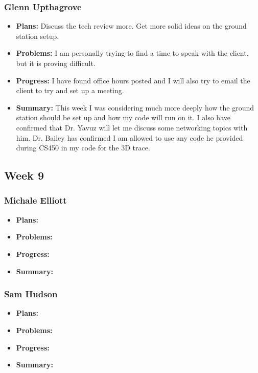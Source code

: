 \documentclass[onecolumn, draftclsnofoot,10pt, compsoc]{IEEEtran}
\begin{document}
\subsubsection{Glenn Upthagrove}
\begin {itemize}
 \item \textbf{Plans: }Discuss the tech review more. Get more solid ideas on the ground station setup. 
 \item \textbf{Problems: }I am personally trying to find a time to speak with the client, but it is proving difficult. 
 \item \textbf{Progress: }I have found office hours posted and I will also try to email the client to try and set up a meeting.
 \item \textbf{Summary: }This week I was considering much more deeply how the ground station should be set up and how my code will run on it. I also have confirmed that Dr. Yavuz will let me discuss some networking topics with him. Dr. Bailey has confirmed I am allowed to use any code he provided during CS450 in my code for the 3D trace.  
\end {itemize}
\subsection {Week 9}
\subsubsection{Michale Elliott}
\begin {itemize}
 \item \textbf{Plans: }
 \item \textbf{Problems: }
 \item \textbf{Progress: }
 \item \textbf{Summary: }
\end {itemize}
\subsubsection{Sam Hudson}
\begin {itemize}
 \item \textbf{Plans: }
 \item \textbf{Problems: }
 \item \textbf{Progress: }
 \item \textbf{Summary: }
\end {itemize}
\end{document}

